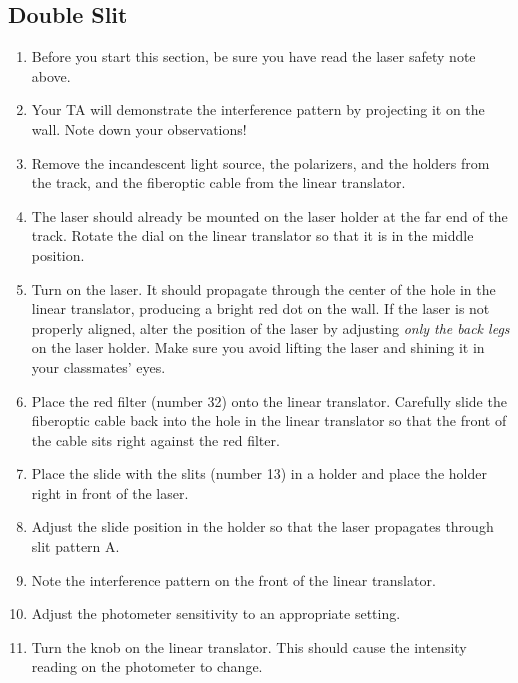 \subsection{Double Slit}
\begin{enumerate}
\item Before you start this section, be sure you have read the laser safety note above.

\item Your TA will demonstrate the interference pattern by projecting it on the wall. Note down your observations!

\item Remove the incandescent light source, the polarizers, and the holders from the track, and the fiberoptic cable from the linear translator.

\item The laser should already be mounted on the laser holder at the far end of the track. Rotate the dial on the linear translator so that it is in the middle position.

\item Turn on the laser. It should propagate through the center of the hole in the linear translator, producing a bright red dot on the wall. If the laser is not properly aligned, alter the position of the laser by adjusting \emph{only the back legs} on the laser holder. Make sure you avoid lifting the laser and shining it in your classmates' eyes.

\item Place the red filter (number 32) onto the linear translator. Carefully slide the fiberoptic cable back into the hole in the linear translator so that the front of the cable sits right against the red filter.

\item Place the slide with the slits (number 13) in a holder and place the holder right in front of the laser.

\item Adjust the slide position in the holder so that the laser propagates through slit pattern A.

\item Note the interference pattern on the front of the linear translator.

\item Adjust the photometer sensitivity to an appropriate setting.

\item Turn the knob on the linear translator. This should cause the intensity reading on the photometer to change.


\end{enumerate}
